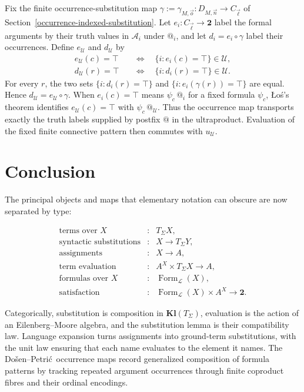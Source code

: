 \documentclass[11pt]{article}
\makeatletter
\newcommand{\atsign}{\mathord{@}}
\newcommand{\DP}{Do\v{s}en--Petri\'{c}}
\makeatother
\begin{document}
Fix the finite occurrence-substitution map
\(\gamma:=\gamma_{M,\vec o}:D_{M,\vec n}\to C_{\vec\ell}\) of
Section~\ref{occurrence-indexed-substitution}. Let
\(e_i:C_{\vec\ell}\to\mathbf2\) label the formal arguments by
their truth values in \(\mathcal A_i\) under \(\atsign_i\), and let
\(d_i=e_i\circ\gamma\) label their occurrences.
Define \(e_{\mathcal U}\) and \(d_{\mathcal U}\) by
\[
\begin{aligned}
e_{\mathcal U}(c)=\top
&\quad\Longleftrightarrow\quad
\{i:e_i(c)=\top\}\in\mathcal U,\\
d_{\mathcal U}(r)=\top
&\quad\Longleftrightarrow\quad
\{i:d_i(r)=\top\}\in\mathcal U.
\end{aligned}
\]
For every \(r\), the two sets
\(\{i:d_i(r)=\top\}\) and
\(\{i:e_i(\gamma(r))=\top\}\) are equal. Hence
\(d_{\mathcal U}=e_{\mathcal U}\circ\gamma\).
When \(e_i(c)=\top\) means
\(\psi_c\,\atsign_i\) for a fixed formula \(\psi_c\),
\L{}o\'s's theorem identifies
\(e_{\mathcal U}(c)=\top\) with
\(\psi_c\,\atsign_{\mathcal U}\).
Thus the occurrence map transports exactly the truth labels supplied
by postfix \(\atsign\) in the ultraproduct. Evaluation of the fixed
finite connective pattern then commutes with
\(u_{\mathcal U}\).


\section{Conclusion}\label{conclusion}

The principal objects and maps that elementary notation can obscure are now
separated by type:

\[
\begin{array}{rcl}
\text{terms over }X &:& T_\Sigma X,\\
\text{syntactic substitutions} &:& X\to T_\Sigma Y,\\
\text{assignments} &:& X\to A,\\
\text{term evaluation} &:& A^X\times T_\Sigma X\to A,\\
\text{formulas over }X &:& \operatorname{Form}_{\mathcal L}(X),\\
\text{satisfaction} &:&
\operatorname{Form}_{\mathcal L}(X)\times A^X\to\mathbf2.
\end{array}
\]

Categorically, substitution is composition in \(\mathbf{Kl}(T_\Sigma)\),
evaluation is the action of an Eilenberg--Moore algebra, and the substitution
lemma is their compatibility law. Language expansion turns assignments into
ground-term substitutions, with the unit law ensuring that each name evaluates
to the element it names. The \DP\ occurrence maps record generalized
composition of formula patterns by tracking repeated argument occurrences
through finite coproduct fibres and their ordinal encodings.
\end{document}
